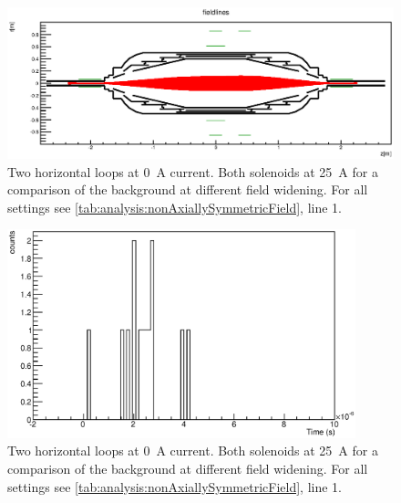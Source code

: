 \begin{figure}
\centering
	\centerline{\includegraphics[width = 1.3\linewidth]{graphics/analysis/monSpec/fieldSimulation/NB.eps} }
	
	\caption[\SI{50}{\ampere} loops]{Two horizontal loops at \SI{0}{\ampere} current. Both solenoids at \SI{25}{\ampere} for a comparison of the background at different field widening. For all settings see \ref{tab:analysis:nonAxiallySymmetricField}, line 1.}
	\label{fig:NBf}
\end{figure}

\begin{figure}[h]
\centering
	\includegraphics[width = 0.9\textwidth]{graphics/analysis/monSpec/NB.eps}
	\caption[\SI{50}{\ampere} loops]{Two horizontal loops at \SI{0}{\ampere} current. Both solenoids at \SI{25}{\ampere} for a comparison of the background at different field widening. For all settings see \ref{tab:analysis:nonAxiallySymmetricField}, line 1.}
	\label{fig:NB}
\end{figure}
\clearpage








